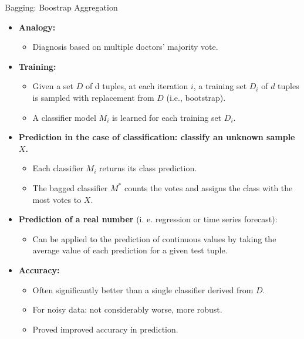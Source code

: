 \begin{frame}{Bagging: Boostrap Aggregation}
	\begin{itemize}
		\item \textbf{Analogy:}
		      \begin{itemize}
			      \item Diagnosis based on multiple doctors' majority vote.
		      \end{itemize}
		\item \textbf{Training:}
		      \begin{itemize}
			      \item Given a set $D$ of d tuples, at each iteration $i$, a training set $D_i$ of $d$ tuples is sampled with replacement from $D$ (i.e., bootstrap).
			      \item A classifier model $M_i$ is learned for each training set $D_i$.
		      \end{itemize}
		\item \textbf{Prediction in the case of classification: classify an unknown sample $X$.}
		      \begin{itemize}
			      \item Each classifier $M_i$ returns its class prediction.
			      \item The bagged classifier $M^*$ counts the votes and assigns the class with the most votes to $X$.
		      \end{itemize}
		\item \textbf{Prediction of a real number} (i. e. regression or time series forecast):
		      \begin{itemize}
			      \item Can be applied to the prediction of continuous values by taking the average value of each prediction for a given test tuple.
		      \end{itemize}
		\item \textbf{Accuracy:}
		      \begin{itemize}
			      \item Often significantly better than a single classifier derived from $D$.
			      \item For noisy data: not considerably worse, more robust.
			      \item Proved improved accuracy in prediction.
		      \end{itemize}
	\end{itemize}
\end{frame}

